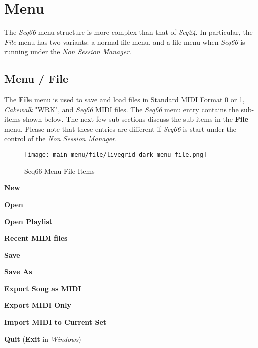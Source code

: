 %
%
%

\section{Menu}
\label{sec:menu}

   The \textsl{Seq66} menu structure is more complex than
   that of \textsl{Seq24}.  In particular, the \textsl{File} menu has two
   variants:  a normal file menu, and a file menu when \textsl{Seq66} is
   running under the \textsl{Non Session Manager}.

\subsection{Menu / File}
\label{subsec:menu_file}

   The \textbf{File} menu is used to save and load files in
   Standard MIDI Format 0 or 1, \textsl{Cakewalk} "WRK",
   and \textsl{Seq66} MIDI files.
   The \textsl{Seq66} menu entry contains the sub-items shown below.
   The next few sub-sections discuss
   the sub-items in the \textbf{File} menu.
   Please note that these entries are different
   if \textsl{Seq66} is start under the control of the
   \textsl{Non Session Manager}.  

\begin{figure}[H]
   \centering 
   \texttt{[image: main-menu/file/livegrid-dark-menu-file.png]}
   \caption{Seq66 Menu File Items}
   \label{fig:menu_file_items}
\end{figure}

   \begin{enumber}
      \item \textbf{New}
      \item \textbf{Open}
      \item \textbf{Open Playlist}
      \item \textbf{Recent MIDI files}
      \item \textbf{Save}
      \item \textbf{Save As}
      \item \textbf{Export Song as MIDI}
      \item \textbf{Export MIDI Only}
      \item \textbf{Import MIDI to Current Set}
      \item \textbf{Quit} (\textbf{Exit} in \textsl{Windows})
   \end{enumber}


